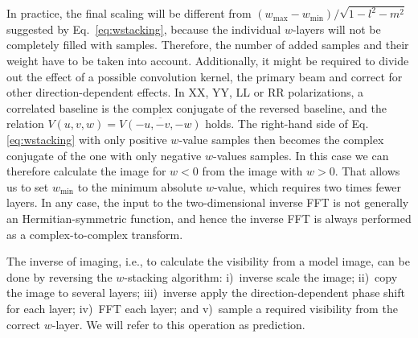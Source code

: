 \documentclass[useAMS,usenatbib]{mn2e}
\begin{document}
In practice, the final scaling will be different from $\left(w_{\max} - w_{\min}\right)/\sqrt{1-l^2-m^2}$ suggested by Eq.~\eqref{eq:wstacking}, because the individual $w$-layers will not be completely filled with samples. Therefore, the number of added samples and their weight have to be taken into account. Additionally, it might be required to divide out the effect of a possible convolution kernel, the primary beam and correct for other direction-dependent effects. In XX, YY, LL or RR polarizations, a correlated baseline is the complex conjugate of the reversed baseline, and the relation $V(u,v,w)=\overline{V(-u,-v,-w)}$ holds. The right-hand side of Eq.\eqref{eq:wstacking} with only positive $w$-value samples then becomes the complex conjugate of the one with only negative $w$-values samples. In this case we can therefore calculate the image for $w<0$ from the image with $w>0$. That allows us to set $w_{\min}$ to the minimum absolute $w$-value, which requires two times fewer layers. In any case, the input to the two-dimensional inverse FFT is not generally an Hermitian-symmetric function, and hence the inverse FFT is always performed as a complex-to-complex transform. 

The inverse of imaging, i.e., to calculate the visibility from a model image, can be done by reversing the $w$-stacking algorithm: i)~inverse scale the image; ii)~copy the image to several layers; iii)~inverse apply the direction-dependent phase shift for each layer; iv)~FFT each layer; and v)~sample a required visibility from the correct $w$-layer. We will refer to this operation as prediction.
\end{document}
